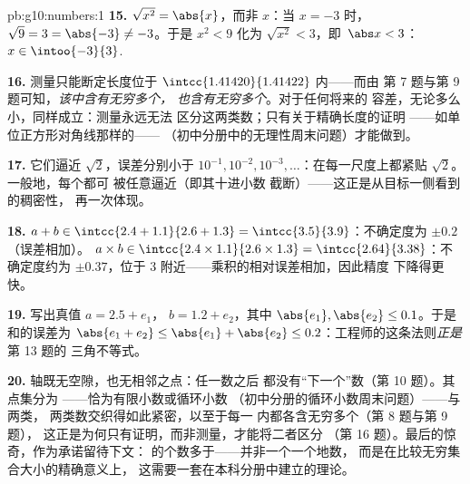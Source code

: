 \begin{solution}{pb:g10:numbers:1}
\textbf{15.} $\sqrt{x^2} = \abs{x}$，而非 $x$：当 $x = -3$ 时，
$\sqrt{9} = 3 = \abs{-3} \neq -3$。于是 $x^2 < 9$ 化为
$\sqrt{x^2} < 3$，即\ $\abs x < 3$：
$x \in \intoo{-3}{3}$.

\textbf{16.} 测量只能断定长度位于
 $\intcc{1.41420}{1.41422}$ 内——而由
第 7 题与第 9 题可知，\emph{该中含有无穷多个，
也含有无穷多个}。对于任何将来的
容差，无论多么小，同样成立：测量永远无法
区分这两类数；只有关于精确长度的证明
——如单位正方形对角线那样的——
（初中分册中的无理性周末问题）才能做到。

\textbf{17.} 它们逼近 $\sqrt2$，误差分别小于
$10^{-1}, 10^{-2}, 10^{-3}, \dots$：在每一尺度上都紧贴
$\sqrt2$。一般地，每个都可
被任意逼近（即其十进小数
截断）——这正是从目标一侧看到的稠密性，
再一次体现。

\textbf{18.} $a + b \in \intcc{2.4 + 1.1}{2.6 + 1.3} =
\intcc{3.5}{3.9}$：不确定度为 $\pm 0.2$（误差相加）。
$a \times b \in \intcc{2.4 \times 1.1}{2.6 \times 1.3} =
\intcc{2.64}{3.38}$：不确定度约为 $\pm 0.37$，位于
$3$ 附近——乘积的相对误差相加，因此精度
下降得更快。

\textbf{19.} 写出真值 $a = 2.5 + e_1$，
$b = 1.2 + e_2$，其中 $\abs{e_1}, \abs{e_2} \leq 0.1$。于是
和的误差为 $\abs{e_1 + e_2} \leq \abs{e_1} +
\abs{e_2} \leq 0.2$：工程师的这条法则\emph{正是}第 13 题的
三角不等式。

\textbf{20.} 轴既无空隙，也无相邻之点：任一数之后
都没有“下一个”数（第 10 题）。其点集分为
——恰为有限小数或循环小数
（初中分册的循环小数周末问题）——与两类，
两类数交织得如此紧密，以至于每一
内都各含无穷多个（第 8 题与第 9 题），
这正是为何只有证明，而非测量，才能将二者区分
（第 16 题）。最后的惊奇，作为承诺留待下文：
的个数多于——并非一个一个地数，
而是在比较无穷集合大小的精确意义上，
这需要一套在本科分册中建立的理论。
\end{solution}
